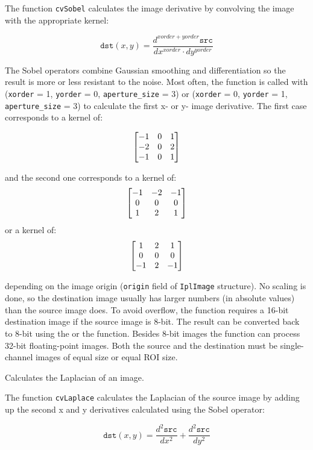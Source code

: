 The function \texttt{cvSobel} calculates the image derivative by convolving the image with the appropriate kernel:

\[
\texttt{dst}(x,y) = \frac{d^{xorder+yorder} \texttt{src}}{dx^{xorder} \cdot dy^{yorder}}
\]

The Sobel operators combine Gaussian smoothing and differentiation
so the result is more or less resistant to the noise. Most often,
the function is called with (\texttt{xorder} = 1, \texttt{yorder} = 0,
\texttt{aperture\_size} = 3) or (\texttt{xorder} = 0, \texttt{yorder} = 1,
\texttt{aperture\_size} = 3) to calculate the first x- or y- image
derivative. The first case corresponds to a kernel of:

\[ \begin{bmatrix} -1 & 0 & 1\\ -2 & 0 & 2\\ -1 & 0 & 1 \end{bmatrix}
\]

and the second one corresponds to a kernel of:
\[ \begin{bmatrix} -1 & -2 & -1\\ 0 & 0 & 0\\ 1 & 2 & 1 \end{bmatrix}
\]
or a kernel of:
\[ \begin{bmatrix} 1 & 2 & 1\\ 0 & 0 & 0\\ -1 & 2 & -1 \end{bmatrix}
\]

depending on the image origin (\texttt{origin} field of
\texttt{IplImage} structure). No scaling is done, so the destination image
usually has larger numbers (in absolute values) than the source image does. To
avoid overflow, the function requires a 16-bit destination image if the
source image is 8-bit. The result can be converted back to 8-bit using the
 or the  function. Besides 8-bit images
the function can process 32-bit floating-point images. Both the source and the 
destination must be single-channel images of equal size or equal ROI size.

\label{Laplace}
\label{Laplace}
Calculates the Laplacian of an image.

\begin{description}
\end{description}

The function \texttt{cvLaplace} calculates the Laplacian of the source image by adding up the second x and y derivatives calculated using the Sobel operator:

\[
\texttt{dst}(x,y) = \frac{d^2 \texttt{src}}{dx^2} + \frac{d^2 \texttt{src}}{dy^2}
\]

